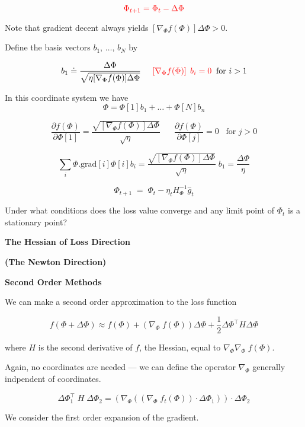 {\vfill
$${\color{red} \Phi_{t+1} = \Phi_t - \Delta \Phi}$$

\vfill
Note that gradient decent always yields $\left[\nabla_\Phi f(\Phi)\right] \Delta \Phi > 0$.

Define the basis vectors $b_1$, $\ldots$, $b_N$ by

\vfill
$$b_1 \doteq \frac{\Delta \Phi}{\sqrt{\eta[\nabla_\Phi f(\Phi)]\Delta \Phi}} \;\;\;\;\;
{\color{red} \left[\nabla_\Phi f(\Phi)\right]\;b_i = 0} \;\;\mbox{for $i > 1$}$$

In this coordinate system we have
$$\Phi = \Phi[1]b_1 + \ldots + \Phi[N]b_n$$

\vfill
$$\frac{\partial f(\Phi)}{\partial \Phi[1]} = \frac{\sqrt{[\nabla_\Phi f(\Phi)]\Delta \Phi}}{\sqrt{\eta}} \;\;\;\;\;\;
\frac{\partial f(\Phi)}{\partial \Phi[j]} = 0 \;\;\;\mbox{for $j > 0$}$$

\vfill
$$\sum_i \Phi.\mathrm{grad}[i]\Phi[i]b_i = \frac{\sqrt{[\nabla_\Phi f(\Phi)]\Delta \Phi}}{\sqrt{\eta}}\;b_1 = \frac{\Delta \Phi}{\eta}$$



$$\Phi_{t+1} \;=\; \Phi_t  -\eta_t H^{-1}_\Phi \hat{g}_t$$

\vfill
Under what conditions does the loss value converge and any limit point of $\Phi_t$ is a stationary point?

\slide{}
\centerline{\bf The Hessian of Loss Direction}
\centerline{\bf (The Newton Direction)}

\vfill
\centerline{\bf Second Order Methods}
\vfill
\vfill


We can make a second order approximation to the loss function

\vfill
$$f(\Phi + \Delta \Phi) \approx f(\Phi) + (\nabla_\Phi \;f(\Phi))\Delta \Phi + \frac{1}{2} \Delta \Phi^\top H \Delta \Phi$$

\vfill
where $H$ is the second derivative of $f$, the Hessian, equal to $\nabla_\Phi \nabla_\Phi \;f(\Phi)$.

\vfill
Again, no coordinates are needed --- we can define the operator $\nabla_\Phi$ generally indpendent of coordinates.

\vfill
$$\Delta \Phi_1^\top\;H\; \Delta \Phi_2 = \left(\nabla_\Phi \left((\nabla_\Phi\; f_t(\Phi))\cdot \Delta \Phi_1\right)\right)\cdot \Delta \Phi_2$$


We consider the first order expansion of the gradient.

}
